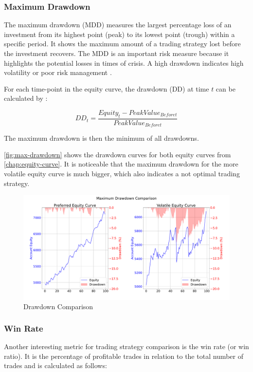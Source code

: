 \subsubsection{Maximum Drawdown}

The maximum drawdown (MDD) measures the largest percentage loss of an investment from its highest point (peak) to its lowest point (trough) within a specific period.
It shows the maximum amount of a trading strategy lost before the investment recovers.
The MDD is an important risk measure because it highlights the potential losses in times of crisis.
A high drawdown indicates high volatility or poor risk management \cite{mdd}.

For each time-point in the equity curve, the drawdown (DD) at time $t$ can be calculated by \cite{dd}:

\[
    DD_t = \frac{Equity_t - PeakValue_{Before t}}{PeakValue_{Before t}}
\]

The maximum drawdown is then the minimum of all drawdowns.

\autoref{fig:max-drawdown} shows the drawdown curves for both equity curves from \autoref{chap:equity-curve}.
It is noticeable that the maximum drawdown for the more volatile equity curve is much bigger, which also indicates a not optimal trading strategy.

\begin{figure}[H]
    \centering
    \includegraphics[width=\textwidth]{images/trading-strategies/max-drawdown}
    \caption{Drawdown Comparison}
    \label{fig:max-drawdown}
\end{figure}

\subsubsection{Win Rate}

Another interesting metric for trading strategy comparison is the win rate (or win ratio).
It is the percentage of profitable trades in relation to the total number of trades and is calculated as follows:

